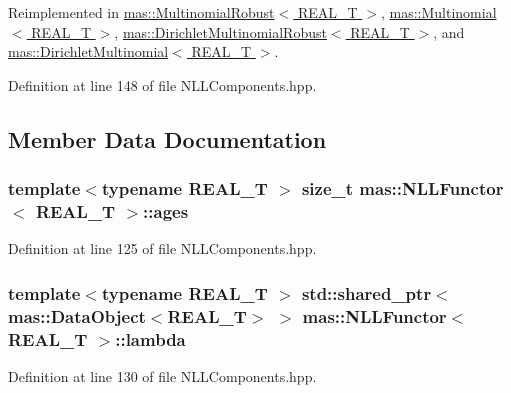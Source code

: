 Reimplemented in \hyperlink{structmas_1_1_multinomial_robust_a57b1509abe3c1640fb0e24f636fbbd87}{mas\-::\-Multinomial\-Robust$<$ R\-E\-A\-L\-\_\-\-T $>$}, \hyperlink{structmas_1_1_multinomial_a90903904b06f2e5a79ffba4981fef34a}{mas\-::\-Multinomial$<$ R\-E\-A\-L\-\_\-\-T $>$}, \hyperlink{structmas_1_1_dirichlet_multinomial_robust_a25f3b78a3072162c8e1fce217a599a14}{mas\-::\-Dirichlet\-Multinomial\-Robust$<$ R\-E\-A\-L\-\_\-\-T $>$}, and \hyperlink{structmas_1_1_dirichlet_multinomial_a92d0abed181db2f54d7d44ac7cb4fa27}{mas\-::\-Dirichlet\-Multinomial$<$ R\-E\-A\-L\-\_\-\-T $>$}.



Definition at line 148 of file N\-L\-L\-Components.\-hpp.



\subsection{Member Data Documentation}
\hypertarget{structmas_1_1_n_l_l_functor_aa70e461c812bff95770cda5dbb79b6b9}{
\subsubsection[{ages}]{\setlength{\rightskip}{0pt plus 5cm}template$<$typename R\-E\-A\-L\-\_\-\-T $>$ size\-\_\-t {\bf mas\-::\-N\-L\-L\-Functor}$<$ R\-E\-A\-L\-\_\-\-T $>$\-::ages}}\label{structmas_1_1_n_l_l_functor_aa70e461c812bff95770cda5dbb79b6b9}


Definition at line 125 of file N\-L\-L\-Components.\-hpp.

\hypertarget{structmas_1_1_n_l_l_functor_a50032d1f03b5743690723c33b62d2b4d}{
\subsubsection[{lambda}]{\setlength{\rightskip}{0pt plus 5cm}template$<$typename R\-E\-A\-L\-\_\-\-T $>$ std\-::shared\-\_\-ptr$<${\bf mas\-::\-Data\-Object}$<$R\-E\-A\-L\-\_\-\-T$>$ $>$ {\bf mas\-::\-N\-L\-L\-Functor}$<$ R\-E\-A\-L\-\_\-\-T $>$\-::lambda}}\label{structmas_1_1_n_l_l_functor_a50032d1f03b5743690723c33b62d2b4d}


Definition at line 130 of file N\-L\-L\-Components.\-hpp.

